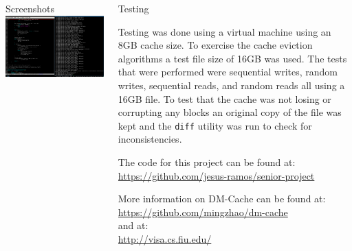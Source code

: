 \documentclass[final,12pt]{beamer}
\begin{document}
\begin{frame}{}
\begin{columns}
    \begin{column}{.5\linewidth}
      \begin{block}{\large Screenshots}
        \centering
        \includegraphics[width=.97\textwidth]{../images/screenshot.png}
      \end{block}
    \end{column}

    \begin{column}{.5\linewidth}
      \begin{block}{\large Testing}

        Testing was done using a virtual machine using an 8GB cache size. To
        exercise the cache eviction algorithms a test file size of 16GB was
        used. The tests that were performed were sequential writes, random
        writes, sequential reads, and random reads all using a 16GB file. To
        test that the cache was not losing or corrupting any blocks an original
        copy of the file was kept and the \texttt{diff} utility was run to check
        for inconsistencies.

        \vspace{\baselineskip}

        The code for this project can be found at:
        \url{https://github.com/jesus-ramos/senior-project}

        More information on DM-Cache can be found at:
        \url{https://github.com/mingzhao/dm-cache} \\
        and at: \\
        \url{http://visa.cs.fiu.edu/}

      \end{block}
    \end{column}

  \end{columns}


\end{frame}
\end{document}
